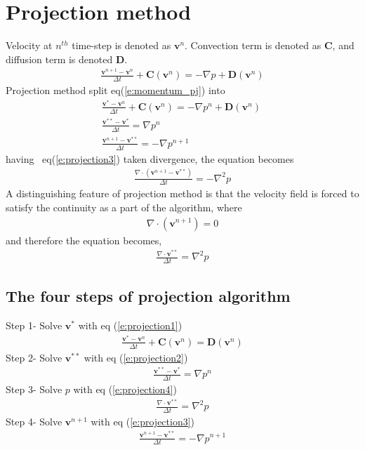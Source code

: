 \documentclass[11pt,dvips]{article}
\numberwithin{equation}{section}
\begin{document}
\section{Projection method}
Velocity at $n^{th}$ time-step is denoted as $\mathbf{v}^n$. Convection term is 
denoted as $\mathbf{C}$, and diffusion term is denoted $\mathbf{D}$.
%
\begin{align}
\frac{\mathbf{v}^{n+1}-\mathbf{v}^{n}}{\Delta t}+\mathbf{C}(\mathbf{v}^{n})=
-\nabla p+\mathbf{D}(\mathbf{v}^{{n}}) \label{e:momentum_pj} 
\end{align}
%
Projection method\cite{ferziger_cfd_2019} split eq(\ref{e:momentum_pj}) into
%
\begin{gather}
\frac{\mathbf{v}^{*}-\mathbf{v}^{n}}{\Delta t}+\mathbf{C}(\mathbf{v}^{n})=-\nabla 
p^{n}+\mathbf{D}(\mathbf{v}^{{n}}) \label{e:projection1}\ \\
\frac{\mathbf{v}^{**}-\mathbf{v}^{*}}{\Delta t}=\nabla p^n \label{e:projection2}\\
\frac{\mathbf{v}^{n+1}-\mathbf{v}^{**}}{\Delta t}=-\nabla p^{n+1}  \label{e:projection3}\
\end{gather}
%
having~ eq(\ref{e:projection3}) taken divergence, the equation becomes
%
\begin{align}
\frac{\nabla \cdot(\mathbf{v}^{n+1}-\mathbf{v}^{**})}{\Delta t}=-\nabla ^2 p
\label{e:div_momentum_pj_b}
\end{align}
%
A distinguishing feature of projection method is that the velocity field is 
forced to satisfy the continuity as a part of the algorithm, where
%
\begin{align}
\nabla \cdot(\mathbf{v}^{n+1})=0 \label{e:continuity_pj}
\end{align}
%
and therefore the equation becomes, 
%
\begin{align}
\frac{\nabla \cdot \mathbf{v}^{**}}{\Delta t}=\nabla ^2 p \label{e:projection4}
\end{align}
%
\subsection{The four steps of projection algorithm}
Step 1- Solve $\mathbf{v}^{*}$ with eq (\ref{e:projection1})
%
\begin{align}
\frac{\mathbf{v}^{*}-\mathbf{v}^{n}}{\Delta t}+\mathbf{C}(\mathbf{v}^{n})=
\mathbf{D}(\mathbf{v}^{{n}})  \nonumber
\end{align}
%
Step 2- Solve $\mathbf{v}^{**}$ with eq (\ref{e:projection2})
%
\begin{align}
\frac{\mathbf{v}^{**}-\mathbf{v}^{*}}{\Delta t}=\nabla p^n \nonumber
\end{align}
%
Step 3- Solve $p$ with eq (\ref{e:projection4})
%
\begin{align}
\frac{\nabla \cdot \mathbf{v}^{**}}{\Delta t}=\nabla ^2 p \nonumber
\end{align}
%
Step 4- Solve $\mathbf{v}^{n+1}$  with eq (\ref{e:projection3})
%
\begin{align}
\frac{\mathbf{v}^{n+1}-\mathbf{v}^{**}}{\Delta t}=-\nabla p^{n+1} \nonumber
\end{align}
%
\end{document}

